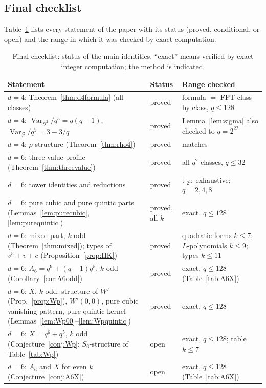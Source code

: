 \documentclass[11pt,a4paper]{amsart}
\theoremstyle{definition}
\newcommand{\F}{\mathbb{F}}
\newcommand{\G}{\mathcal{G}}
\newcommand{\Var}{\operatorname{Var}}
\begin{document}
\subsection{Final checklist}\label{sec:numerics}
Table~\ref{tab:status} lists every statement of the paper with its status (proved, conditional, or open) and the range in which it was checked by exact computation.
\begin{table}[H]
\centering
\caption{Final checklist: status of the main identities. ``exact'' means verified by exact integer computation; the method is indicated.}\label{tab:status}
\small
\begin{tabular}{@{}p{}p{}p{}@{}}
\toprule
Statement & Status & Range checked\\
\midrule
$d=4$: Theorem~\ref{thm:d4formula} (all classes) & proved & formula $=$ FFT class by class, $q\le128$\\
$d=4$: $\Var_{\G^2}/q^5=q(q-1)$, $\Var_\G/q^5=3-3/q$ & proved & Lemma~\ref{lem:sigma} also checked to $q=2^{22}$\\
$d=4$: $\rho$ structure (Theorem~\ref{thm:rho4}) & proved & matches \cite[Table 4]{Chen}\\
$d=6$: three-value profile (Theorem~\ref{thm:threevalue}) & proved & all $q^2$ classes, $q\le32$\\
$d=6$: tower identities and reductions & proved & $\F_{2^{12}}$ exhaustive; $q=2,4,8$\\
$d=6$: pure cubic and pure quintic parts (Lemmas~\ref{lem:purecubic}, \ref{lem:purequintic}) & proved, all $k$ & exact, $q\le128$\\
$d=6$: mixed part, $k$ odd (Theorem~\ref{thm:mixed}); types of $v^5+v+c$ (Proposition~\ref{prop:HK}) & proved & quadratic forms $k\le7$; $L$-polynomials $k\le9$; types $k\le11$\\
$d=6$: $A_6=q^9+(q-1)q^5$, $k$ odd (Corollary~\ref{cor:A6odd}) & proved & exact, $q\le128$ (Table~\ref{tab:A6X})\\
$d=6$: $X$, $k$ odd: structure of $W'$ (Prop.~\ref{prop:Wp}), $W'(0,0)$, pure cubic vanishing pattern, pure quintic kernel (Lemmas~\ref{lem:Wp00}--\ref{lem:Wpquintic}) & proved & exact, $q\le128$\\
$d=6$: $X=q^6+q^5$, $k$ odd (Conjecture~\ref{conj:Wp}; $S_6$-structure of Table~\ref{tab:Wp}) & open & exact, $q\le128$; table $k\le7$\\
$d=6$: $A_6$ and $X$ for even $k$ (Conjecture~\ref{conj:A6X}) & open & exact, $q\le128$ (Table~\ref{tab:A6X})\\

\end{tabular}
\end{table}
\end{document}
